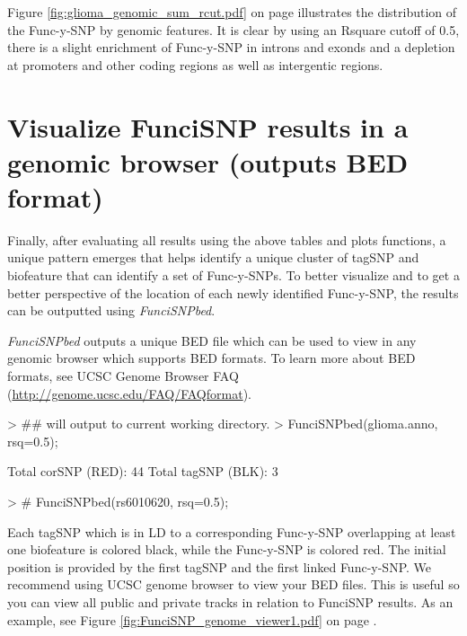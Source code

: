 \documentclass[12pt,fullpage]{article}
\newcommand{\Rmethod}[1]{{\textit{#1}}}
\begin{document}
Figure \ref{fig:glioma_genomic_sum_rcut.pdf} on page                             
\pageref{fig:glioma_genomic_sum_rcut.pdf} illustrates the distribution of the       
Func-y-SNP by genomic features. It is clear by using an Rsquare cutoff of 0.5,   
        there is a slight enrichment of Func-y-SNP in introns and exonds and a          
            depletion at promoters and other coding regions as well as
            intergentic       
                regions.

\newpage


\section{Visualize FunciSNP results in a genomic browser (outputs BED format)}

Finally, after evaluating all results using the above tables and plots
functions, a unique pattern emerges that helps identify a unique cluster of
tagSNP and biofeature that can identify a set of Func-y-SNPs. To better
visualize and to get a better perspective of the location of each newly
identified Func-y-SNP, the results can be outputted using \Rmethod{FunciSNPbed}.

\Rmethod{FunciSNPbed} outputs a unique BED file which can be used to view in any
genomic browser which supports BED formats. To learn more about BED formats, see
UCSC Genome Browser FAQ (\url{http://genome.ucsc.edu/FAQ/FAQformat}). 

\begin{Schunk}
\begin{Sinput}
> ## will output to current working directory.
> FunciSNPbed(glioma.anno, rsq=0.5);
\end{Sinput}
\begin{Soutput}
Total corSNP (RED):  44 
Total tagSNP (BLK):  3 
\end{Soutput}
\begin{Sinput}
> # FunciSNPbed(rs6010620, rsq=0.5);
\end{Sinput}
\end{Schunk}

Each tagSNP which is in LD to a corresponding Func-y-SNP overlapping at least
one biofeature is colored black, while the Func-y-SNP is colored red. The
initial position is provided by the first tagSNP and the first linked
Func-y-SNP. We recommend using UCSC genome browser to view your BED files. This
is useful so you can view all public and private tracks in relation to FunciSNP
results. As an example, see Figure \ref{fig:FunciSNP_genome_viewer1.pdf} on page
\pageref{fig:FunciSNP_genome_viewer1.pdf}.
\end{document}

